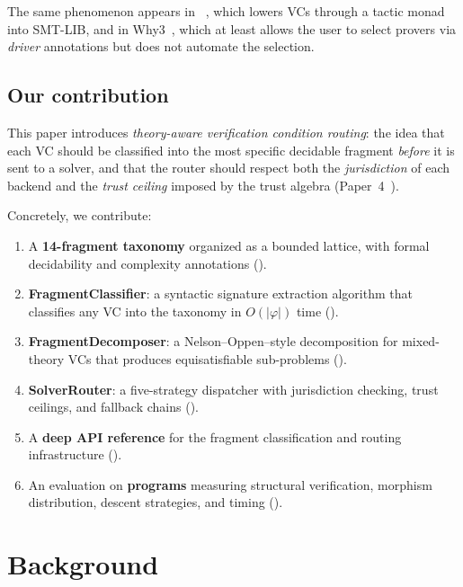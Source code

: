 \documentclass[11pt]{article}
\begin{document}
The same phenomenon appears in \Fstar{}~\cite{fstar}, which
lowers VCs through a tactic monad into SMT-LIB, and in
Why3~\cite{why3}, which at least allows the user to select
provers via \emph{driver} annotations but does not automate
the selection.

\subsection{Our contribution}

This paper introduces \emph{theory-aware verification condition
routing}: the idea that each VC should be classified into the
most specific decidable fragment \emph{before} it is sent to
a solver, and that the router should respect both the
\emph{jurisdiction} of each backend and the \emph{trust ceiling}
imposed by the trust algebra (Paper~4~\cite{paper04}).

Concretely, we contribute:

\begin{enumerate}[label=(\roman*)]
  \item A \textbf{14-fragment taxonomy} organized as a bounded
    lattice, with formal decidability and complexity annotations
    ().
  \item \textbf{FragmentClassifier}: a syntactic signature
    extraction algorithm that classifies any VC into the taxonomy
    in $O(|\varphi|)$ time ().
  \item \textbf{FragmentDecomposer}: a Nelson--Oppen--style
    decomposition for mixed-theory VCs that produces
    equisatisfiable sub-problems ().
  \item \textbf{SolverRouter}: a five-strategy dispatcher
    with jurisdiction checking, trust ceilings, and fallback
    chains ().
  \item A \textbf{deep API reference} for the \JuGeo{} fragment
    classification and routing infrastructure ().
  \item An evaluation on \textbf{\compTotalPrograms{} programs} measuring
    structural verification, morphism distribution, descent strategies,
    and timing ().
\end{enumerate}

\section{Background}\label{sec:background}
\end{document}
